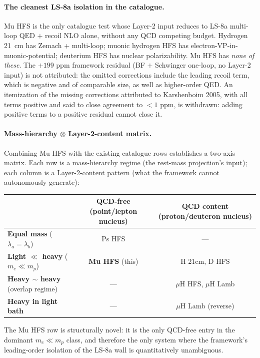 \documentclass[11pt]{article}
\begin{document}
\paragraph{The cleanest LS-8a isolation in the catalogue.}  Mu HFS
is the only catalogue test whose Layer-2 input reduces to LS-8a
multi-loop QED $+$ recoil NLO alone, without any QCD competing budget.
Hydrogen 21~cm has Zemach + multi-loop; muonic hydrogen HFS has
electron-VP-in-muonic-potential; deuterium HFS has nuclear polarizability.
Mu HFS has \emph{none of these}.  The $+199$ ppm framework residual
(BF $+$ Schwinger one-loop, no Layer-2 input) is not attributed: the
omitted corrections include the leading recoil term, which is negative
and of comparable size, as well as higher-order QED.  An itemization of
the missing corrections attributed to Karshenboim 2005, with all terms
positive and said to close agreement to $<1$ ppm, is withdrawn: adding
positive terms to a positive residual cannot close it.

\paragraph{Mass-hierarchy $\otimes$ Layer-2-content matrix.}
Combining Mu HFS with the existing catalogue rows establishes a
two-axis matrix.  Each row is a mass-hierarchy regime (the rest-mass
projection's input); each column is a Layer-2-content pattern
(what the framework cannot autonomously generate):

\begin{center}
\begin{tabular}{l|cc}
\toprule
& \textbf{QCD-free} (point/lepton nucleus) & \textbf{QCD content} (proton/deuteron nucleus) \\
\midrule
\textbf{Equal mass} ($\lambda_a = \lambda_b$) & Ps HFS & --- \\
\textbf{Light $\ll$ heavy} ($m_e \ll m_p$) & \textbf{Mu HFS} (this) & H 21cm, D HFS \\
\textbf{Heavy $\sim$ heavy} (overlap regime) & --- & $\mu$H HFS, $\mu$H Lamb \\
\textbf{Heavy in light bath} & --- & $\mu$H Lamb (reverse) \\
\bottomrule
\end{tabular}
\end{center}

The Mu HFS row is structurally novel: it is the only QCD-free entry
in the dominant $m_e \ll m_p$ class, and therefore the only system
where the framework's leading-order isolation of the LS-8a wall is
quantitatively unambiguous.
\end{document}
